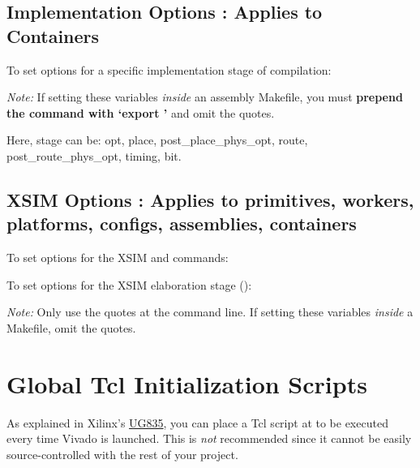 \begin{flushleft}
\subsection{Implementation Options : Applies to Containers}
To set options for a specific implementation stage of compilation:\newline
{}\newline
{\footnotesize \textit{Note:} If setting these variables \textit{inside} an assembly Makefile, you must \textbf{prepend the command with `export '} and omit the quotes.\par}

Here, stage can be: opt, place, post\_place\_phys\_opt, route, post\_route\_phys\_opt, timing, bit.\newline


\subsection{XSIM Options : Applies to primitives, workers, platforms, configs, assemblies, containers}
To set options for the XSIM  and  commands:\newline
{}\newline

To set options for the XSIM elaboration stage ():\newline
{}\newline
{\footnotesize \textit{Note:} Only use the quotes at the command line. If setting these variables \textit{inside} a Makefile, omit the quotes.\par}
\section{Global Tcl Initialization Scripts}
As explained in Xilinx's \href{https://www.xilinx.com/support/documentation/sw_manuals/xilinx2017_1/ug835-vivado-tcl-commands.pdf}{UG835}, you can place a Tcl script at  to be executed every time Vivado is launched. This is \textit{not} recommended since it cannot be easily source-controlled with the rest of your project.


\end{flushleft}
